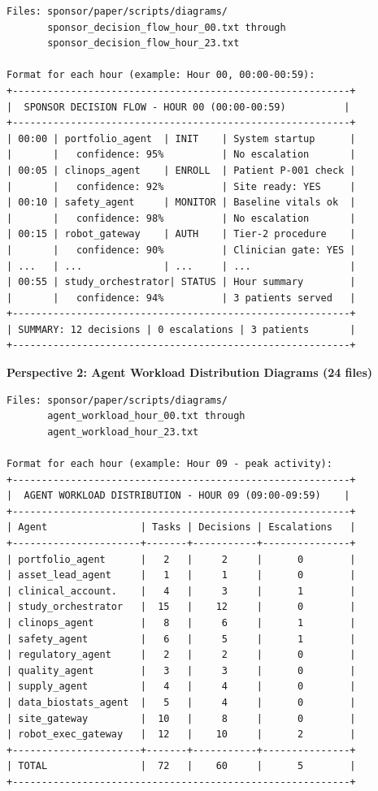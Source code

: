 \begin{verbatim}
Files: sponsor/paper/scripts/diagrams/
       sponsor_decision_flow_hour_00.txt through
       sponsor_decision_flow_hour_23.txt

Format for each hour (example: Hour 00, 00:00-00:59):
+----------------------------------------------------------+
|  SPONSOR DECISION FLOW - HOUR 00 (00:00-00:59)          |
+----------------------------------------------------------+
| 00:00 | portfolio_agent  | INIT    | System startup      |
|       |   confidence: 95%          | No escalation       |
| 00:05 | clinops_agent    | ENROLL  | Patient P-001 check |
|       |   confidence: 92%          | Site ready: YES     |
| 00:10 | safety_agent     | MONITOR | Baseline vitals ok  |
|       |   confidence: 98%          | No escalation       |
| 00:15 | robot_gateway    | AUTH    | Tier-2 procedure    |
|       |   confidence: 90%          | Clinician gate: YES |
| ...   | ...              | ...     | ...                 |
| 00:55 | study_orchestrator| STATUS | Hour summary        |
|       |   confidence: 94%          | 3 patients served   |
+----------------------------------------------------------+
| SUMMARY: 12 decisions | 0 escalations | 3 patients       |
+----------------------------------------------------------+
\end{verbatim}

\textbf{Perspective 2: Agent Workload Distribution Diagrams (24 files)}

\begin{verbatim}
Files: sponsor/paper/scripts/diagrams/
       agent_workload_hour_00.txt through
       agent_workload_hour_23.txt

Format for each hour (example: Hour 09 - peak activity):
+----------------------------------------------------------+
|  AGENT WORKLOAD DISTRIBUTION - HOUR 09 (09:00-09:59)    |
+----------------------------------------------------------+
| Agent                | Tasks | Decisions | Escalations   |
+----------------------+-------+-----------+---------------+
| portfolio_agent      |   2   |     2     |      0        |
| asset_lead_agent     |   1   |     1     |      0        |
| clinical_account.    |   4   |     3     |      1        |
| study_orchestrator   |  15   |    12     |      0        |
| clinops_agent        |   8   |     6     |      1        |
| safety_agent         |   6   |     5     |      1        |
| regulatory_agent     |   2   |     2     |      0        |
| quality_agent        |   3   |     3     |      0        |
| supply_agent         |   4   |     4     |      0        |
| data_biostats_agent  |   5   |     4     |      0        |
| site_gateway         |  10   |     8     |      0        |
| robot_exec_gateway   |  12   |    10     |      2        |
+----------------------+-------+-----------+---------------+
| TOTAL                |  72   |    60     |      5        |
+----------------------------------------------------------+
\end{verbatim}

